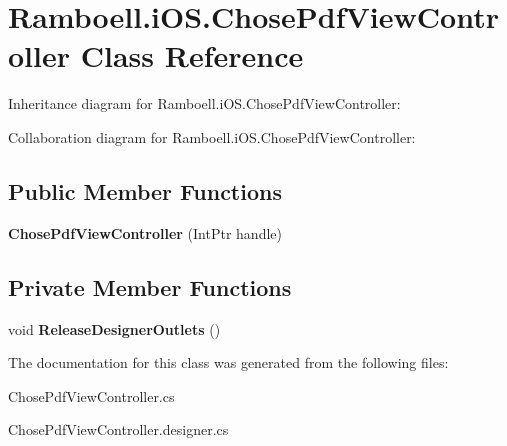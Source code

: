 \hypertarget{class_ramboell_1_1i_o_s_1_1_chose_pdf_view_controller}{}\section{Ramboell.\+i\+O\+S.\+Chose\+Pdf\+View\+Controller Class Reference}
\label{class_ramboell_1_1i_o_s_1_1_chose_pdf_view_controller}


Inheritance diagram for Ramboell.\+i\+O\+S.\+Chose\+Pdf\+View\+Controller\+:


Collaboration diagram for Ramboell.\+i\+O\+S.\+Chose\+Pdf\+View\+Controller\+:
\subsection*{Public Member Functions}
\begin{DoxyCompactItemize}
\item 
\mbox{\label{class_ramboell_1_1i_o_s_1_1_chose_pdf_view_controller_afa454435a512e52b9a10840d0cceb671}} 
{\bfseries Chose\+Pdf\+View\+Controller} (Int\+Ptr handle)
\end{DoxyCompactItemize}
\subsection*{Private Member Functions}
\begin{DoxyCompactItemize}
\item 
\mbox{\label{class_ramboell_1_1i_o_s_1_1_chose_pdf_view_controller_ab05425d202701de77743977bf74ee4e4}} 
void {\bfseries Release\+Designer\+Outlets} ()
\end{DoxyCompactItemize}


The documentation for this class was generated from the following files\+:\begin{DoxyCompactItemize}
\item 
Chose\+Pdf\+View\+Controller.\+cs\item 
Chose\+Pdf\+View\+Controller.\+designer.\+cs\end{DoxyCompactItemize}
